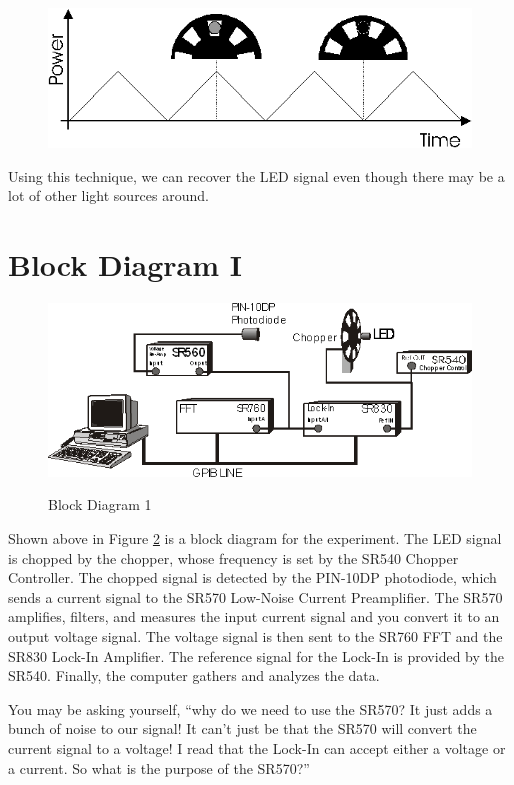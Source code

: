 \documentclass{../lab}
\begin{document}
\begin{figure}[h]
    \centering
    \href{http://experimentationlab.berkeley.edu/sites/default/files/images/LLSimage044.gif}{\includegraphics[width=0.5\linewidth]{images/LLSimage044.png}}
    \caption{}
    \label{fig:PowerVsTime}
\end{figure}

\noindent Using this technique, we can recover the LED signal even though there may be a lot of other light sources around.

\section{Block Diagram I}

\begin{figure}[h]
    \centering
    \href{http://experimentationlab.berkeley.edu/sites/default/files/images/LLSimage045.gif}{\includegraphics[width=0.5\linewidth]{images/LLSimage045.png}}
    \caption{Block Diagram 1}
    \label{fig:BlockDiagramI}
\end{figure}

Shown above in Figure \ref{fig:BlockDiagramI} is a block diagram for the experiment. The LED signal is chopped by the chopper, whose frequency is set by the SR540 Chopper Controller. The chopped signal is detected by the PIN-10DP photodiode, which sends a current signal to the SR570 Low-Noise Current Preamplifier. The SR570 amplifies, filters, and measures the input current signal and you convert it to an output voltage signal. The voltage signal is then sent to the SR760 FFT and the SR830 Lock-In Amplifier. The reference signal for the Lock-In is provided by the SR540. Finally, the computer gathers and analyzes the data.

You may be asking yourself, ``why do we need to use the SR570? It just adds a bunch of noise to our signal! It can't just be that the SR570 will convert the current signal to a voltage! I read that the Lock-In can accept either a voltage or a current. So what is the purpose of the SR570?''
\end{document}
